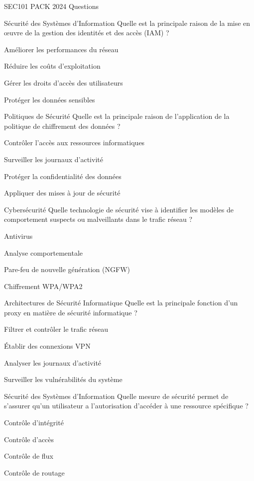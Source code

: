 \documentclass[12pt]{article}
\begin{document}
\begin{quiz}{SEC101 PACK 2024 Questions}
  \begin{multi}[points=1]{Sécurité des Systèmes d'Information}
    Quelle est la principale raison de la mise en œuvre de la gestion des identités et des accès (IAM) ?
    \item Améliorer les performances du réseau
    \item Réduire les coûts d'exploitation
    \item* Gérer les droits d'accès des utilisateurs
    \item Protéger les données sensibles
  \end{multi}

  \begin{multi}[points=1]{Politiques de Sécurité}
    Quelle est la principale raison de l'application de la politique de chiffrement des données ?
    \item Contrôler l'accès aux ressources informatiques
    \item Surveiller les journaux d'activité
    \item* Protéger la confidentialité des données
    \item Appliquer des mises à jour de sécurité
  \end{multi}

  \begin{multi}[points=1]{Cybersécurité}
    Quelle technologie de sécurité vise à identifier les modèles de comportement suspects ou malveillants dans le trafic réseau ?
    \item Antivirus
    \item* Analyse comportementale
    \item Pare-feu de nouvelle génération (NGFW)
    \item Chiffrement WPA/WPA2
  \end{multi}

  \begin{multi}[points=1]{Architectures de Sécurité Informatique}
    Quelle est la principale fonction d'un proxy en matière de sécurité informatique ?
    \item* Filtrer et contrôler le trafic réseau
    \item Établir des connexions VPN
    \item Analyser les journaux d'activité
    \item Surveiller les vulnérabilités du système
  \end{multi}
  

\begin{multi}[points=1]{Sécurité des Systèmes d'Information}
    Quelle mesure de sécurité permet de s'assurer qu'un utilisateur a l'autorisation d'accéder à une ressource spécifique ?
    \item Contrôle d'intégrité
    \item* Contrôle d'accès
    \item Contrôle de flux
    \item Contrôle de routage
  \end{multi}


\end{quiz}
\end{document}
